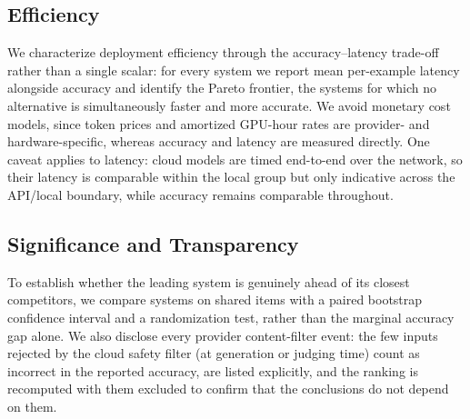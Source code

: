 \subsection{Efficiency}
We characterize deployment efficiency through the accuracy--latency trade-off rather than a single scalar: for every system we report mean per-example latency alongside accuracy and identify the Pareto frontier, the systems for which no alternative is simultaneously faster and more accurate. We avoid monetary cost models, since token prices and amortized GPU-hour rates are provider- and hardware-specific, whereas accuracy and latency are measured directly. One caveat applies to latency: cloud models are timed end-to-end over the network, so their latency is comparable within the local group but only indicative across the API/local boundary, while accuracy remains comparable throughout.

\subsection{Significance and Transparency}
To establish whether the leading system is genuinely ahead of its closest competitors, we compare systems on shared items with a paired bootstrap confidence interval and a randomization test, rather than the marginal accuracy gap alone. We also disclose every provider content-filter event: the few inputs rejected by the cloud safety filter (at generation or judging time) count as incorrect in the reported accuracy, are listed explicitly, and the ranking is recomputed with them excluded to confirm that the conclusions do not depend on them.






